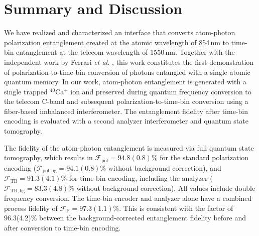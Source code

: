 \documentclass[reprint, superscriptaddress, longbibliography, floatfix, twocolumn, nofootinbib, amsmath, amssymb, aps, showkeys]{revtex4-2}
\begin{document}





\section{Summary and Discussion}%

We have realized and characterized an interface that converts atom-photon polarization entanglement created at the atomic wavelength of 854\,nm to time-bin entanglement at the telecom wavelength of 1550\,nm. Together with the independent work by Ferrari \textit{et al.} \cite{Ferrari_2026}, this work constitutes the first demonstration of polarization-to-time-bin conversion of photons entangled with a single atomic quantum memory. In our work, atom-photon entanglement is generated with a single trapped $^{40}$Ca$^+$ ion and preserved during quantum frequency conversion to the telecom C-band and subsequent polarization-to-time-bin conversion using a fiber-based imbalanced interferometer. The entanglement fidelity after time-bin encoding is evaluated with a second analyzer interferometer and quantum state tomography.

The fidelity of the atom-photon entanglement is measured via full quantum state tomography, which results in $\mathcal{F}_\mathrm{pol}=94.8(0.8)\%$ for the standard polarization encoding ($\mathcal{F}_\mathrm{pol,bg}=94.1(0.8)\%$ without background correction), and $\mathcal{F}_\mathrm{TB}=91.3(4.1)\%$ for time-bin encoding, including the analyzer ($\mathcal{F}_\mathrm{TB,bg}=83.3(4.8)\%$ without background correction). All values include double frequency conversion. The time-bin encoder and analyzer alone have a combined process fidelity of $\mathcal{F}_\mathrm{P}=97.3(1.1)\%$. This is consistent with the factor of 96.3(4.2)\% between the background-corrected entanglement fidelity before and after conversion to time-bin encoding. 
\end{document}
